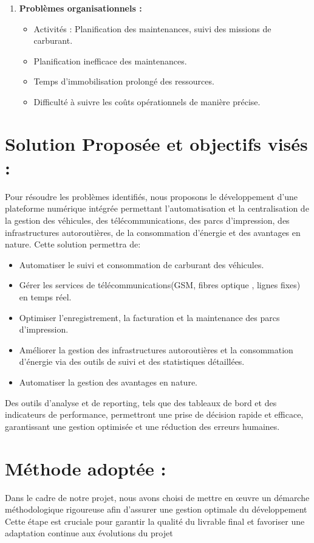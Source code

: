 \documentclass[a4paper,11pt]{report}
\begin{document}
\begin{enumerate}
\item \textbf{Problèmes organisationnels :}

\begin{itemize}

	\item Activités : Planification des maintenances, suivi des missions de carburant.
	\item Planification inefficace des maintenances.
	\item Temps d'immobilisation prolongé des ressources.
	\item Difficulté à suivre les coûts opérationnels de manière précise.
\end{itemize}

\end{enumerate}


\section{Solution Proposée et objectifs visés : }

Pour résoudre les problèmes identifiés, nous proposons le développement d'une plateforme numérique intégrée permettant l'automatisation et la centralisation de la gestion des véhicules, des télécommunications, des parcs d'impression, des infrastructures autoroutières, de la consommation d'énergie et des avantages en nature. Cette solution permettra de:
\begin{itemize}
\item Automatiser le suivi et consommation de carburant des véhicules.
\item Gérer les services de télécommunications(GSM, fibres optique , lignes fixes) en temps réel.
\item Optimiser l'enregistrement, la facturation et la maintenance des parcs d'impression.
\item Améliorer la gestion des infrastructures autoroutières et la consommation d'énergie via des outils de suivi et des statistiques détaillées.
\item Automatiser la gestion des avantages en nature.

\end{itemize}
Des outils d'analyse et de reporting, tels que des tableaux de bord et des indicateurs de performance, permettront une prise de décision rapide et efficace, garantissant une gestion optimisée et une réduction des erreurs humaines.

\section{Méthode adoptée : }
Dans le cadre de notre projet, nous avons choisi de mettre en œuvre un démarche méthodologique rigoureuse afin d'assurer une gestion optimale du développement
Cette étape est cruciale pour garantir la qualité du livrable final et favoriser une adaptation continue aux évolutions du projet
\end{document}
